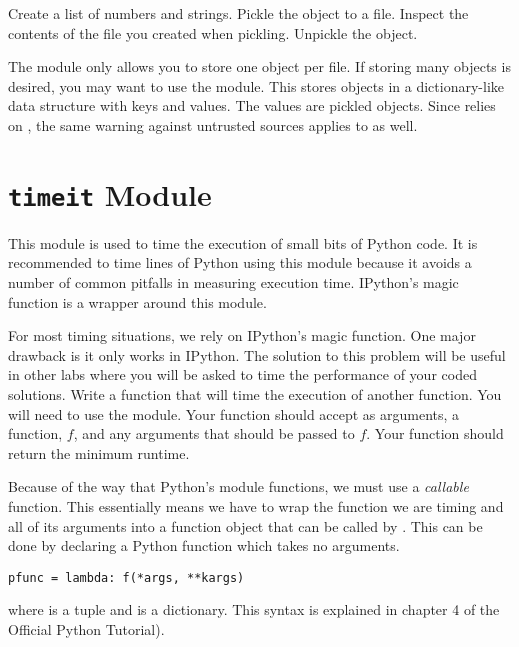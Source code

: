 \begin{problem}
Create a list of numbers and strings.
Pickle the object to a file.
Inspect the contents of the file you created when pickling.
Unpickle the object.
\end{problem}

The  module only allows you to store one object per file.
If storing many objects is desired, you may want to use the  module.
This stores objects in a dictionary-like data structure with keys and values.
The values are pickled objects.
Since  relies on , the same warning against untrusted sources applies to  as well.

\section*{\texttt{timeit} Module}
This module is used to time the execution of small bits of Python code.
It is recommended to time lines of Python using this module because it avoids a number of common pitfalls in measuring execution time.
IPython's  magic function is a wrapper around this module.  

\begin{problem}
For most timing situations, we rely on IPython's  magic function.
One major drawback is it only works in IPython.
The solution to this problem will be useful in other labs where you will be asked to time the performance of your coded solutions.
Write a function that will time the execution of another function.
You will need to use the  module.
Your function should accept as arguments, a function, $f$, and any arguments that should be passed to $f$.
Your function should return the minimum runtime.

Because of the way that Python's  module functions, we must use a \emph{callable} function.
This essentially means we have to wrap the function we are timing and all of its arguments into a function object that can be called by .
This can be done by declaring a Python  function which takes no arguments.
\begin{lstlisting}
pfunc = lambda: f(*args, **kargs)
\end{lstlisting}
where  is a tuple and  is a dictionary.  
This syntax is explained in chapter 4 of the Official Python Tutorial).
\end{problem}


